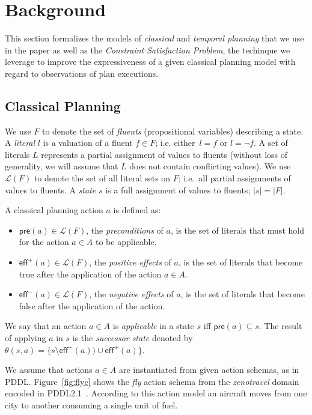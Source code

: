 \documentclass[letterpaper]{article} %
\newcommand{\pre}{\mathsf{pre}}     %
\newcommand{\eff}{\mathsf{eff}}     %
\begin{document}
\section{Background}
\label{sec:background}
This section formalizes the models of {\em classical} and {\em temporal planning} that we use in the paper as well as the {\em Constraint Satisfaction Problem}, the techinque we leverage to improve the expressiveness of a given classical planning model with regard to observations of plan executions.

\subsection{Classical Planning}
We use $F$ to denote the set of {\em fluents} (propositional variables) describing a state. A {\em literal} $l$ is a valuation of a fluent $f\in F$; i.e. either~$l=f$ or $l=\neg f$. A set of literals $L$ represents a partial assignment of values to fluents (without loss of generality, we will assume that $L$ does not contain conflicting values). We use $\mathcal{L}(F)$ to denote the set of all literal sets on $F$; i.e.~all partial assignments of values to fluents. A {\em state} $s$ is a full assignment of values to fluents; $|s|=|F|$. 

A classical planning action $a$ is defined as:
\begin{itemize}
\item $\pre(a)\in\mathcal{L}(F)$, the {\em preconditions} of $a$, is the set of literals that must hold for the action $a\in A$ to be applicable.
\item $\eff^+(a)\in\mathcal{L}(F)$, the {\em positive effects} of $a$, is the set of literals that become true after the application of the action $a\in A$.
\item $\eff^-(a)\in\mathcal{L}(F)$, the {\em negative effects} of $a$, is the set of literals that become false after the application of the action.
\end{itemize}
We say that an action $a\in A$ is {\em applicable} in a state $s$ iff $\pre(a)\subseteq s$. The result of applying $a$ in $s$ is the {\em successor state} denoted by $\theta(s,a)=\{s\setminus\eff^-(a))\cup\eff^+(a)\}$.

We assume that actions $a\in A$ are instantiated from given action schemas, as in PDDL. Figure~\ref{fig:flyc} shows the {\em fly} action schema from the {\em zenotravel} domain encoded in PDDL2.1~\cite{fox2003pddl2}. According to this action model an aircraft moves from one city to another consuming a single unit of fuel.
\end{document}
